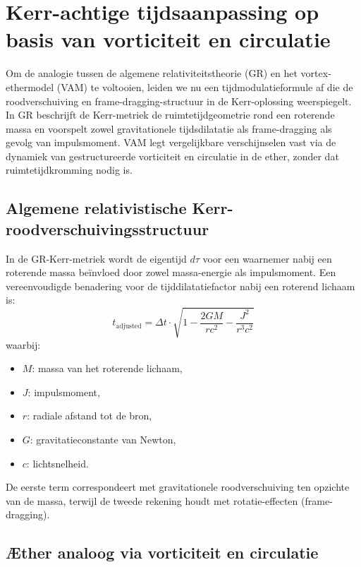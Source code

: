 \section{Kerr-achtige tijdsaanpassing op basis van vorticiteit en circulatie}

Om de analogie tussen de algemene relativiteitstheorie (GR) en het vortex-ethermodel (VAM) te voltooien, leiden we nu een tijdmodulatieformule af die de roodverschuiving en frame-dragging-structuur in de Kerr-oplossing weerspiegelt. In GR beschrijft de Kerr-metriek de ruimtetijdgeometrie rond een roterende massa en voorspelt zowel gravitationele tijdsdilatatie als frame-dragging als gevolg van impulsmoment. VAM legt vergelijkbare verschijnselen vast via de dynamiek van gestructureerde vorticiteit en circulatie in de ether, zonder dat ruimtetijdkromming nodig is.

\subsection{Algemene relativistische Kerr-roodverschuivingsstructuur}

In de GR-Kerr-metriek wordt de eigentijd $d\tau$ voor een waarnemer nabij een roterende massa beïnvloed door zowel massa-energie als impulsmoment. Een vereenvoudigde benadering voor de tijddilatatiefactor nabij een roterend lichaam is:
\begin{equation}
t_{\text{adjusted}} = \Delta t \cdot \sqrt{1 - \frac{2GM}{rc^2} - \frac{J^2}{r^3c^2}}
\label{eq:Kerr_time_dilation}
\end{equation}
waarbij:
\begin{itemize}
\item $M$: massa van het roterende lichaam,
\item $J$: impulsmoment,
\item $r$: radiale afstand tot de bron,
\item $G$: gravitatieconstante van Newton,
\item $c$: lichtsnelheid.
\end{itemize}

De eerste term correspondeert met gravitationele roodverschuiving ten opzichte van de massa, terwijl de tweede rekening houdt met rotatie-effecten (frame-dragging).

\subsection{Æther analoog via vorticiteit en circulatie}

